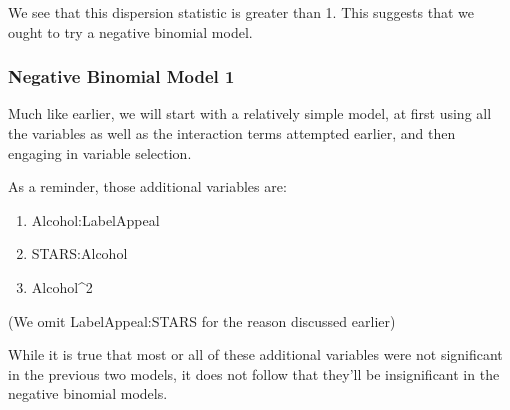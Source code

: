 \documentclass[
]{article}
\providecommand{\tightlist}{%
  \setlength{\itemsep}{0pt}\setlength{\parskip}{0pt}}
\begin{document}
We see that this dispersion statistic is greater than 1. This suggests
that we ought to try a negative binomial model.

\subsubsection{Negative Binomial Model
1}\label{negative-binomial-model-1}

Much like earlier, we will start with a relatively simple model, at
first using all the variables as well as the interaction terms attempted
earlier, and then engaging in variable selection.

As a reminder, those additional variables are:

\begin{enumerate}
\def\labelenumi{\arabic{enumi}.}
\tightlist
\item
  Alcohol:LabelAppeal
\item
  STARS:Alcohol
\item
  Alcohol\^{}2
\end{enumerate}

(We omit LabelAppeal:STARS for the reason discussed earlier)

While it is true that most or all of these additional variables were not
significant in the previous two models, it does not follow that they'll
be insignificant in the negative binomial models.
\end{document}
